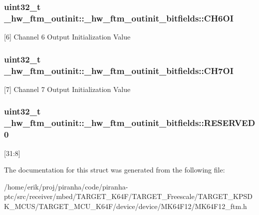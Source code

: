 \subsubsection[{\texorpdfstring{C\+H6\+OI}{CH6OI}}]{\setlength{\rightskip}{0pt plus 5cm}uint32\+\_\+t \+\_\+hw\+\_\+ftm\+\_\+outinit\+::\+\_\+hw\+\_\+ftm\+\_\+outinit\+\_\+bitfields\+::\+C\+H6\+OI}\hypertarget{struct__hw__ftm__outinit_1_1__hw__ftm__outinit__bitfields_ac4216440396b7e7aa7244153ee0cd647}{}\label{struct__hw__ftm__outinit_1_1__hw__ftm__outinit__bitfields_ac4216440396b7e7aa7244153ee0cd647}
\mbox{[}6\mbox{]} Channel 6 Output Initialization Value 
\subsubsection[{\texorpdfstring{C\+H7\+OI}{CH7OI}}]{\setlength{\rightskip}{0pt plus 5cm}uint32\+\_\+t \+\_\+hw\+\_\+ftm\+\_\+outinit\+::\+\_\+hw\+\_\+ftm\+\_\+outinit\+\_\+bitfields\+::\+C\+H7\+OI}\hypertarget{struct__hw__ftm__outinit_1_1__hw__ftm__outinit__bitfields_a0ab691c18c3a3f99b196d73710a4e49d}{}\label{struct__hw__ftm__outinit_1_1__hw__ftm__outinit__bitfields_a0ab691c18c3a3f99b196d73710a4e49d}
\mbox{[}7\mbox{]} Channel 7 Output Initialization Value 
\subsubsection[{\texorpdfstring{R\+E\+S\+E\+R\+V\+E\+D0}{RESERVED0}}]{\setlength{\rightskip}{0pt plus 5cm}uint32\+\_\+t \+\_\+hw\+\_\+ftm\+\_\+outinit\+::\+\_\+hw\+\_\+ftm\+\_\+outinit\+\_\+bitfields\+::\+R\+E\+S\+E\+R\+V\+E\+D0}\hypertarget{struct__hw__ftm__outinit_1_1__hw__ftm__outinit__bitfields_acf5a18badec79bd54a0d88bed1b01620}{}\label{struct__hw__ftm__outinit_1_1__hw__ftm__outinit__bitfields_acf5a18badec79bd54a0d88bed1b01620}
\mbox{[}31\+:8\mbox{]} 

The documentation for this struct was generated from the following file\+:\begin{DoxyCompactItemize}
\item 
/home/erik/proj/piranha/code/piranha-\/ptc/src/receiver/mbed/\+T\+A\+R\+G\+E\+T\+\_\+\+K64\+F/\+T\+A\+R\+G\+E\+T\+\_\+\+Freescale/\+T\+A\+R\+G\+E\+T\+\_\+\+K\+P\+S\+D\+K\+\_\+\+M\+C\+U\+S/\+T\+A\+R\+G\+E\+T\+\_\+\+M\+C\+U\+\_\+\+K64\+F/device/device/\+M\+K64\+F12/M\+K64\+F12\+\_\+ftm.\+h\end{DoxyCompactItemize}
